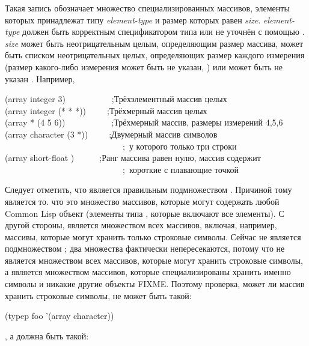 \begin{flushdesc}
\item[\cd{(array \emph{element-type} \emph{size})}]
  Такая запись обозначает множество специализированных массивов, элементы которых
  принадлежат типу \emph{element-type} и размер которых равен \emph{size}.
  \emph{element-type} должен быть корректным спецификатором типа или не уточнён с
  помощью \cd{*}.
  \emph{size} может быть неотрицательным целым, определяющим размер массива,
  может быть списком неотрицательных целых, определяющих размер каждого измерения
  (размер какого-либо измерения может быть не указан, \cd{*}) или может быть не
  указан \cd{*}.
  Например,
  \begin{lisp}
    (array integer 3)~~~~~~~~~~~;\textrm{Трёхэлементный массив целых} \\
    (array integer (* * *))~~~~~;\textrm{Трёхмерный массив целых} \\
    (array * (4 5 6))~~~~~~~~~~~;\textrm{Трёхмерный массив, размеры измерений
      4,5,6} \\
    (array character (3 *))~~~~~;\textrm{Двумерный массив символов} \\
    ~~~~~~~~~~~~~~~~~~~~~~~~~~~~;~\textrm{у которого только три строки} \\
    (array short-float {\emptylist})~~~~~~;\textrm{Ранг массива равен нулю, массив содержит} \\
    ~~~~~~~~~~~~~~~~~~~~~~~~~~~~;~\textrm{короткие с плавающие точкой}
  \end{lisp}
  Следует отметить, что  является правильным подмножеством
  .
  Причиной тому является то. что  это множество массивов, которые
  могут содержать любой Common Lisp объект (элементы типа , которые включают
  все элементы). С другой стороны,  является множеством всех
  массивов, включая, например, массивы, которые могут хранить только строковые
  символы. Сейчас  не является подмножеством ;
  два множества фактически непересекаются, потому что  не
  является множеством всех массивов, которые могут хранить строковые символы, а
  является множеством массивов, которые специализированы хранить именно символы и
  никакие другие объекты FIXME. Поэтому проверка, может ли массив  хранить
  строковые символы, не может быть такой:
  \begin{lisp}
    (typep foo '(array character))
  \end{lisp}
  , а должна быть такой:

\end{flushdesc}
